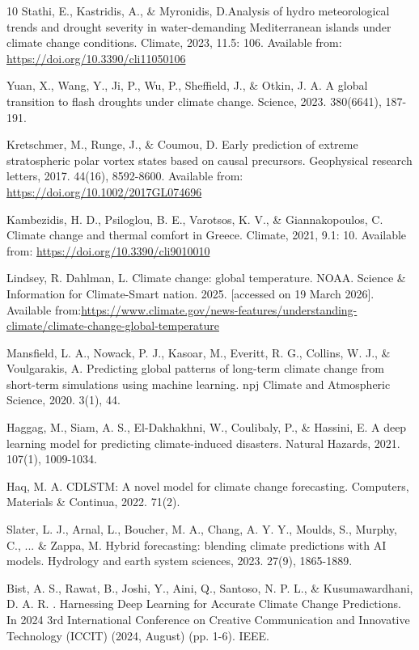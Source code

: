 \documentclass[12pt]{Definitions/academia}
\begin{document}
\begin{thebibliography}{10}
 Stathi, E., Kastridis, A., \& Myronidis, D.Analysis
of hydro meteorological trends and drought severity in water-demanding
Mediterranean islands under climate change conditions. Climate, 2023,
11.5: 106. Available from: \url{https://doi.org/10.3390/cli11050106}

Yuan, X., Wang, Y., Ji, P., Wu, P., Sheffield, J.,
\& Otkin, J. A. A global transition to flash droughts under climate
change. Science, 2023. 380(6641), 187-191.

 Kretschmer, M., Runge, J., \& Coumou, D.
Early prediction of extreme stratospheric polar vortex states based
on causal precursors. Geophysical research letters, 2017. 44(16),
8592-8600. Available from: \url{ https://doi.org/10.1002/2017GL074696}

 Kambezidis, H. D., Psiloglou, B. E., Varotsos,
K. V., \& Giannakopoulos, C. Climate change and thermal comfort in
Greece. Climate, 2021, 9.1: 10. Available from: \url{ https://doi.org/10.3390/cli9010010}

 Lindsey, R. Dahlman, L. Climate change: global
temperature. NOAA. Science \& Information for Climate-Smart nation.
2025. {[}accessed on 19 March 2026{]}. Available from:\url{https://www.climate.gov/news-features/understanding-climate/climate-change-global-temperature}

 Mansfield, L. A., Nowack, P. J., Kasoar,
M., Everitt, R. G., Collins, W. J., \& Voulgarakis, A. Predicting
global patterns of long-term climate change from short-term simulations
using machine learning. npj Climate and Atmospheric Science, 2020.
3(1), 44.

Haggag, M., Siam, A. S., El-Dakhakhni, W.,
Coulibaly, P., \& Hassini, E. A deep learning model for predicting
climate-induced disasters. Natural Hazards, 2021. 107(1), 1009-1034.

 Haq, M. A. CDLSTM: A novel model for climate change
forecasting. Computers, Materials \& Continua, 2022. 71(2).

 Slater, L. J., Arnal, L., Boucher, M. A., Chang,
A. Y. Y., Moulds, S., Murphy, C., ... \& Zappa, M. Hybrid forecasting:
blending climate predictions with AI models. Hydrology and earth system
sciences, 2023. 27(9), 1865-1889.

Bist, A. S., Rawat, B., Joshi, Y., Aini, Q.,
Santoso, N. P. L., \& Kusumawardhani, D. A. R. . Harnessing Deep Learning
for Accurate Climate Change Predictions. In 2024 3rd International
Conference on Creative Communication and Innovative Technology (ICCIT)
(2024, August) (pp. 1-6). IEEE.


\end{thebibliography}
\end{document}
